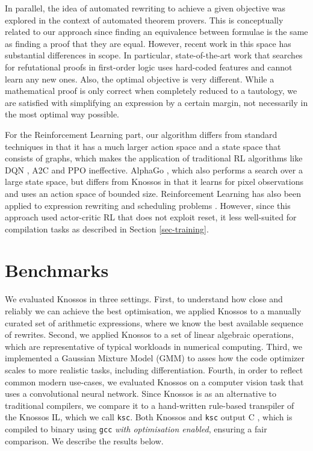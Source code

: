 \documentclass[fullpage,twocolumn]{article} %
\def\Cpp{{C\nolinebreak[4]\hspace{-.05em}\raisebox{.4ex}{\tiny\bf ++}} }
\begin{document}
In parallel, the idea of automated rewriting to achieve a given objective was explored in the context of automated theorem provers. This is conceptually related to our approach since finding an equivalence between formulae is the same as finding a proof that they are equal. However, recent work in this space has substantial differences in scope. In particular, state-of-the-art work that searches for refutational proofs in first-order logic \citep{zomboriFindingLongerProofs2019, kaliszykReinforcementLearningTheorem2018} uses hard-coded features and cannot learn any new ones. Also, the optimal objective is very different. While a mathematical proof is only correct when completely reduced to a tautology, we are satisfied with simplifying an expression by a certain margin, not necessarily in the most optimal way possible. 

For the Reinforcement Learning part, our algorithm differs from standard techniques in that it has a much larger action space and a state space that consists of graphs, which makes the application of traditional RL algorithms like DQN \citep{mnih2013playing}, A2C \citep{mnih2016asynchronous} and PPO \citep{schulman2017proximal} ineffective. AlphaGo \citep{Silver2016, silver2017mastering}, which also performs a search over a large state space, but differs from Knossos in that it learns for pixel observations and uses an action space of bounded size. Reinforcement Learning has also been applied to expression rewriting and scheduling problems \citep{chen-rewrite-schedule}. However, since this approach used actor-critic RL that does not exploit reset, it less well-suited for compilation tasks as described in Section \ref{sec-training}.


\section{Benchmarks}
\label{sec-benchmarks}


We evaluated Knossos in three settings. First, to understand how close and reliably we can achieve the best optimisation, we applied Knossos to a manually curated set of arithmetic expressions, where we know the best available sequence of rewrites. Second, we applied Knossos to a set of linear algebraic operations, which are representative of typical workloads in numerical computing. 
Third, we implemented a Gaussian Mixture Model (GMM) to asses how the code optimizer scales to more realistic tasks, including differentiation. 
Fourth,
in order to reflect common modern use-cases, we evaluated Knossos on a computer vision task that uses a convolutional neural network.  Since Knossos is as an alternative to traditional compilers,
we compare it to a hand-written rule-based transpiler of the Knossos IL, which we call \texttt{ksc}. Both Knossos and \texttt{ksc} output \Cpp, which is compiled to binary using \texttt{gcc} \emph{with optimisation enabled}, ensuring a fair comparison. We describe the results below. 
\end{document}
